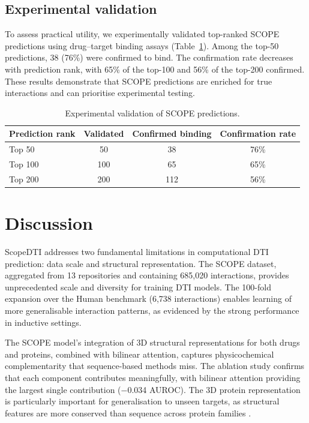 \documentclass[11pt]{article}
\begin{document}
\subsection{Experimental validation}

To assess practical utility, we experimentally validated top-ranked SCOPE predictions using drug--target binding assays (Table~\ref{tab:validation}). Among the top-50 predictions, 38 (76\%) were confirmed to bind. The confirmation rate decreases with prediction rank, with 65\% of the top-100 and 56\% of the top-200 confirmed. These results demonstrate that SCOPE predictions are enriched for true interactions and can prioritise experimental testing.

\begin{table}[htbp]
\centering
\caption{Experimental validation of SCOPE predictions.}
\label{tab:validation}
\begin{tabular}{@{}lccc@{}}
\toprule
Prediction rank & Validated & Confirmed binding & Confirmation rate \\
\midrule
Top 50  & 50  & 38  & 76\% \\
Top 100 & 100 & 65  & 65\% \\
Top 200 & 200 & 112 & 56\% \\
\bottomrule
\end{tabular}
\end{table}

\section{Discussion}

ScopeDTI addresses two fundamental limitations in computational DTI prediction: data scale and structural representation. The SCOPE dataset, aggregated from 13 repositories and containing 685,020 interactions, provides unprecedented scale and diversity for training DTI models. The 100-fold expansion over the Human benchmark (6,738 interactions) enables learning of more generalisable interaction patterns, as evidenced by the strong performance in inductive settings.

The SCOPE model's integration of 3D structural representations for both drugs and proteins, combined with bilinear attention, captures physicochemical complementarity that sequence-based methods miss. The ablation study confirms that each component contributes meaningfully, with bilinear attention providing the largest single contribution ($-$0.034 AUROC). The 3D protein representation is particularly important for generalisation to unseen targets, as structural features are more conserved than sequence across protein families \citep{stepniewska2018}.
\end{document}
